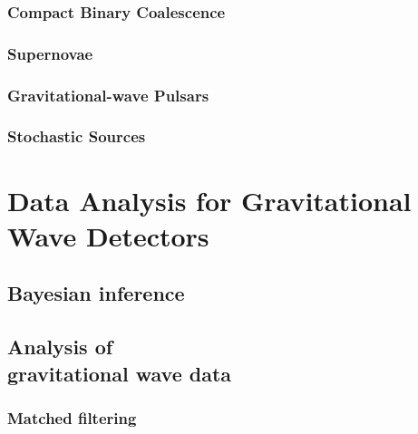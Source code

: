 \documentclass{kentigern}
\theoremstyle{definition}
\begin{document}




 \section{Compact Binary Coalescence}
 \label{sec:cbc}
 

 \section{Supernovae}
 \label{sec:sn}
 

 \section{Gravitational-wave Pulsars}
 \label{sec:pulsar}
 

 \section{Stochastic Sources}
 \label{sec:stochastic-sources}
 


\part{Data Analysis for Gravitational Wave Detectors}
\label{part:data-analysis}
 
\chapter{Bayesian inference}
\label{cha:bayesian-inference}
\chapterprecis{}



%

\chapter[Data Analysis]{Analysis of \\gravitational wave data}
\label{cha:data-analys-grav}

\section{Matched filtering}
\label{sec:matched-filtering}

\end{document}
